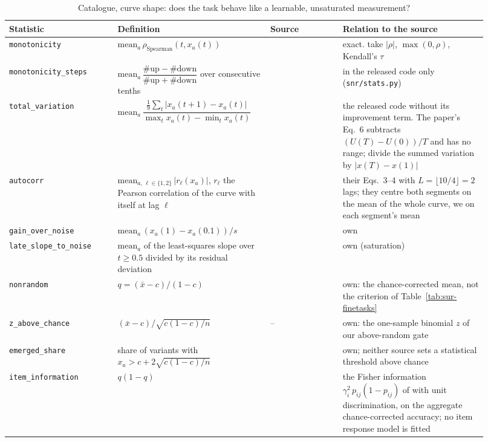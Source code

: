 \begin{table}[h]
\centering
\scriptsize
\begin{tabular}{@{}p{0.215\linewidth}p{0.28\linewidth}p{0.14\linewidth}p{0.285\linewidth}@{}}
\toprule
\textbf{Statistic} & \textbf{Definition} & \textbf{Source} & \textbf{Relation to the source} \\
\midrule
\texttt{monotonicity} & $\mathrm{mean}_a\,\rho_{\text{Spearman}}(t, x_a(t))$ & \citet{kydlicek_finetasks_nodate} & exact. \citet{hofmann_fluid_2025} take $|\rho|$, \citet{yagoubi_e2lm_2025} $\max(0, \rho)$, \citet{madaan_quantifying_2024} Kendall's $\tau$ \\
\texttt{monotonicity\_steps} & $\mathrm{mean}_a\,\dfrac{\#\text{up} - \#\text{down}}{\#\text{up} + \#\text{down}}$ over consecutive tenths & \citet{heineman_signal_2025} & in the released code only (\texttt{snr/stats.py}) \\
\texttt{total\_variation} & $\mathrm{mean}_a\,\dfrac{\frac{1}{9}\sum_{t}|x_a(t{+}1) - x_a(t)|}{\max_t x_a(t) - \min_t x_a(t)}$ & \citet{heineman_signal_2025, hofmann_fluid_2025} & the released code without its improvement term. The paper's Eq.~6 subtracts $(U(T) - U(0))/T$ and has no range; \citet{hofmann_fluid_2025} divide the summed variation by $|x(T) - x(1)|$ \\
\texttt{autocorr} & $\mathrm{mean}_{a,\,\ell \in \{1,2\}}\,|r_\ell(x_a)|$, $r_\ell$ the Pearson correlation of the curve with itself at lag $\ell$ & \citet{yagoubi_e2lm_2025} & their Eqs.~3--4 with $L = \lfloor 10/4 \rfloor = 2$ lags; they centre both segments on the mean of the whole curve, we on each segment's mean \\
\texttt{gain\_over\_noise} & $\mathrm{mean}_a\,(x_a(1) - x_a(0.1))/s$ & \citet{madaan_quantifying_2024} & own \\
\texttt{late\_slope\_to\_noise} & $\mathrm{mean}_a$ of the least-squares slope over $t \geq 0.5$ divided by its residual deviation & \citet{hofmann_fluid_2025} & own (saturation) \\
\texttt{nonrandom} & $q = (\bar{x} - c)/(1 - c)$ & \citet{kydlicek_finetasks_nodate} & own: the chance-corrected mean, not the criterion of Table~\ref{tab:sur-finetasks} \\
\texttt{z\_above\_chance} & $(\bar{x} - c)/\sqrt{c(1-c)/n}$ & -- & own: the one-sample binomial $z$ of our above-random gate \\
\texttt{emerged\_share} & share of variants with $x_a > c + 2\sqrt{c(1-c)/n}$ & \citet{du_understanding_2024, schaeffer_are_2023} & own; neither source sets a statistical threshold above chance \\
\texttt{item\_information} & $q(1 - q)$ & \citet{rodriguez_evaluation_2021, vania_comparing_2021} & the Fisher information $\gamma_i^2\,p_{ij}(1 - p_{ij})$ of \citet{rodriguez_evaluation_2021} with unit discrimination, on the aggregate chance-corrected accuracy; no item response model is fitted \\
\bottomrule
\end{tabular}
\caption{Catalogue, curve shape: does the task behave like a learnable, unsaturated measurement?}
\label{tab:sur-shape}
\end{table}

